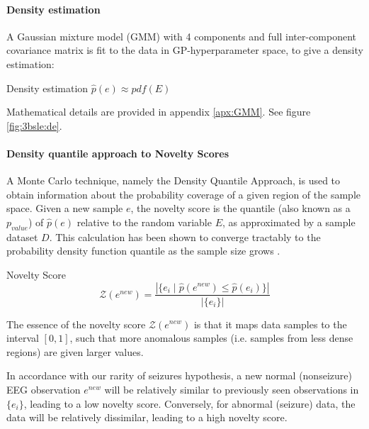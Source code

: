 \paragraph{Density estimation}
A Gaussian mixture model (GMM) with 4 components and full inter-component covariance matrix is fit to the data in GP-hyperparameter space, to give a density estimation:

\begin{definition}{Density estimation}
    $\hat{p}(e) \approx pdf(E)$
\end{definition}
\label{eq:c3bsle:de}

Mathematical details are provided in appendix \ref{apx:GMM}. See figure \ref{fig:3bsle:de}.



\paragraph{Density quantile approach to Novelty Scores}

A Monte Carlo technique, namely the Density Quantile Approach, is used to obtain information about the probability coverage of a given region of the sample space. Given a new sample $e$, the novelty score is the quantile (also known as a $p_{value}$) of $\hat{p}(e)$ relative to the random variable $E$, as approximated by a sample dataset $D$. This calculation has been shown to converge tractably to the probability density function quantile as the sample size grows \cite{hyndman1996computing}. 

\begin{definition}{Novelty Score}
    \begin{equation}
    \label{eq:c3bsle:novelty_score}
    \mathcal{Z}(e^{new}) = \frac{\left|\{ e_i \mid \hat{p}(e^{new}) \le \hat{p}(e_i) \} \right|}{|\{ e_i\} |}
    \end{equation}
\end{definition}

The essence of the novelty score $\mathcal{Z}(e^{new})$ is that it maps data samples to the interval $[0, 1]$, such that more anomalous samples (i.e. samples from less dense regions) are given larger values.

In accordance with our rarity of seizures hypothesis, a new normal (nonseizure) EEG observation $e^{new}$ will be relatively similar to previously seen observations in $\{ e_i \}$, leading to a low novelty score. Conversely, for abnormal (seizure) data, the data will be relatively dissimilar, leading to a high novelty score.

